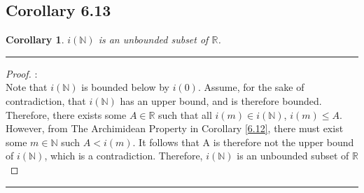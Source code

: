 \documentclass[openany, amssymb, psamsfonts]{amsart}
\newcommand{\bbN}{\mathbb{N}}
\newcommand{\bbR}{\mathbb{R}}
\newtheorem{cor}{Corollary}[section]
\theoremstyle{definition}
\numberwithin{equation}{section}
\begin{document}
\subsection*{Corollary 6.13}
\begin{cor}
\label{6.13}
$i(\bbN)$ is an unbounded subset of $\bbR$.
\end{cor}
\vspace{4pt}     \hrule   \vspace{4pt} \begin{proof}:\\
Note that $\textit{i}(\bbN)$ is bounded below by $i(0)$.
Assume, for the sake of contradiction, that $i(\bbN)$ has an upper bound, and is therefore bounded. Therefore, there exists some $A\in \bbR$ such that all $i(m)\in i(\bbN)$, $i(m)\leq A$. However, from The Archimidean Property in Corollary \ref{6.12}, there must exist some $m\in \bbN$ such $A< i(m)$. It follows that A is therefore not the upper bound of $i(\bbN)$, which is a contradiction. Therefore, $i(\bbN)$ is an unbounded subset of $\bbR$
\end{proof}\vspace{4pt}     \hrule   \vspace{4pt}
\end{document}
